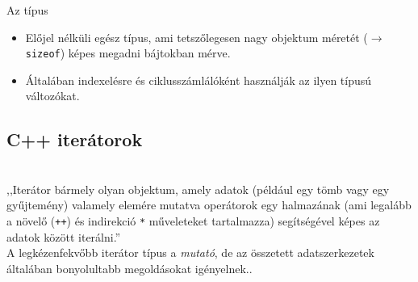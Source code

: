 \documentclass[usenames,dvipsnames,aspectratio=169]{beamer}
\begin{document}
\begin{frame}
    \begin{exampleblock}{}
        \scriptsize
        
    \end{exampleblock}
\end{frame}

\begin{frame}
    \begin{exampleblock}{}
        \scriptsize
        
    \end{exampleblock}
\end{frame}

\begin{frame}
    Az  típus
    \begin{itemize}
        \item Előjel nélküli egész típus, ami tetszőlegesen nagy objektum méretét ($\to$ \texttt{sizeof}) képes megadni bájtokban mérve.
        \item Általában indexelésre és ciklusszámlálóként használják az ilyen típusú változókat. 
    \end{itemize}
\end{frame}

\subsection{C++ iterátorok}

\begin{frame}
    \begin{description}[m]
        \item[C++ iterátorok] \hfill \\ ,,Iterátor bármely olyan objektum, amely adatok (például egy tömb vagy egy gyűjtemény) valamely elemére mutatva operátorok egy halmazának (ami legalább a növelő (\texttt{++}) és indirekció \texttt{*} műveleteket tartalmazza) segítségével képes az adatok között iterálni.'' \\
        A legkézenfekvőbb iterátor típus a \emph{mutató}, de az összetett adatszerkezetek általában bonyolultabb megoldásokat igényelnek..
    \end{description}
\end{frame}
\end{document}
